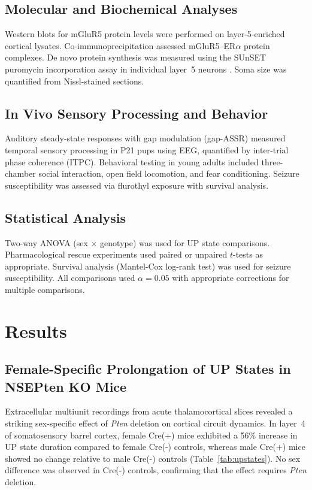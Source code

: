 \documentclass[11pt]{article}
\begin{document}
\subsection{Molecular and Biochemical Analyses}

Western blots for mGluR5 protein levels were performed on layer-5-enriched cortical lysates. Co-immunoprecipitation assessed mGluR5--ER$\alpha$ protein complexes. De novo protein synthesis was measured using the SUnSET puromycin incorporation assay in individual layer~5 neurons \citep{schmidt2009}. Soma size was quantified from Nissl-stained sections.

\subsection{In Vivo Sensory Processing and Behavior}

Auditory steady-state responses with gap modulation (gap-ASSR) measured temporal sensory processing in P21 pups using EEG, quantified by inter-trial phase coherence (ITPC). Behavioral testing in young adults included three-chamber social interaction, open field locomotion, and fear conditioning. Seizure susceptibility was assessed via flurothyl exposure with survival analysis.

\subsection{Statistical Analysis}

Two-way ANOVA (sex $\times$ genotype) was used for UP state comparisons. Pharmacological rescue experiments used paired or unpaired $t$-tests as appropriate. Survival analysis (Mantel-Cox log-rank test) was used for seizure susceptibility. All comparisons used $\alpha = 0.05$ with appropriate corrections for multiple comparisons.

\section{Results}

\subsection{Female-Specific Prolongation of UP States in NSEPten KO Mice}

Extracellular multiunit recordings from acute thalamocortical slices revealed a striking sex-specific effect of \textit{Pten} deletion on cortical circuit dynamics. In layer~4 of somatosensory barrel cortex, female Cre(+) mice exhibited a 56\% increase in UP state duration compared to female Cre(-) controls, whereas male Cre(+) mice showed no change relative to male Cre(-) controls (Table~\ref{tab:upstates}). No sex difference was observed in Cre(-) controls, confirming that the effect requires \textit{Pten} deletion.
\end{document}
